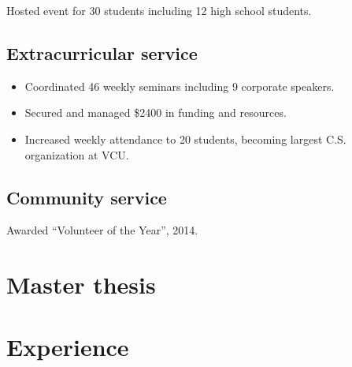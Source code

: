\documentclass[11pt,letterpaper]{moderncv}
\begin{document}
{
	\begin{adjustwidth}{.25in}{}
		Hosted event for 30 students including 12 high school students.
	\end{adjustwidth}
}

\subsection{Extracurricular service}
{
	\begin{adjustwidth}{.25in}{}
		\begin{itemize}
			\item Coordinated 46 weekly seminars including 9 corporate speakers.
			\item Secured and managed \$2400 in funding and resources.
			\item Increased weekly attendance to 20 students, becoming largest C.S. organization at VCU.
		\end{itemize}
	\end{adjustwidth}
}

\subsection{Community service}
{
	\begin{adjustwidth}{.25in}{}
		Awarded ``Volunteer of the Year'', 2014.
	\end{adjustwidth}
}



\section{Master thesis}

\section{Experience}
\end{document}

